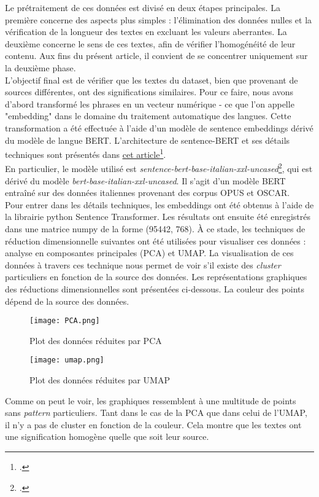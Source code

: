 Le prétraitement de ces données est divisé en deux étapes principales. La première concerne des aspects plus simples : l'élimination des données nulles et la vérification de la longueur des textes en excluant les valeurs aberrantes. La deuxième concerne le sens de ces textes, afin de vérifier l'homogénéité de leur contenu. Aux fins du présent article, il convient de se concentrer uniquement sur la deuxième phase.
\\

L'objectif final est de vérifier que les textes du dataset, bien que provenant de sources différentes, ont des significations similaires. Pour ce faire, nous avons d'abord transformé les phrases en un vecteur numérique - ce que l'on appelle "embedding" dans le domaine du traitement automatique des langues. Cette transformation a été effectuée à l'aide d'un modèle de sentence embeddings dérivé du modèle de langue BERT. L'architecture de sentence-BERT et ses détails techniques sont présentés dans \underline{\href{https://arxiv.org/abs/1908.10084}{cet article}}\footcite{reimers2019}.  \\
En particulier, le modèle utilisé est \emph{sentence-bert-base-italian-xxl-uncased}\footcite{sentenceBERT2024}, qui est dérivé du modèle \emph{bert-base-italian-xxl-uncased}. Il s'agit d'un modèle BERT entraîné sur des données italiennes provenant des corpus OPUS et OSCAR. \\

Pour entrer dans les détails techniques, les embeddings ont été obtenus à l'aide de la librairie python Sentence Transformer. Les résultats ont ensuite été enregistrés dans une matrice numpy de la forme (95442, 768). À ce stade, les techniques de réduction dimensionnelle suivantes ont été utilisées pour visualiser ces données : analyse en composantes principales (PCA) et UMAP. La visualisation de ces données à travers ces technique nous permet de voir s'il existe des \emph{cluster} particuliers en fonction de la source des données. Les représentations graphiques des réductions dimensionnelles sont présentées ci-dessous. La couleur des points dépend de la source des données.

\begin{figure}[h!]
	\texttt{[image: PCA.png]}
	\centering
	\caption{Plot des données réduites par PCA}
\end{figure}

\begin{figure}[h!]
	\texttt{[image: umap.png]}
	\centering
	\caption{Plot des données réduites par UMAP}
\end{figure}

\clearpage

Comme on peut le voir, les graphiques ressemblent à une multitude de points sans \emph{pattern} particuliers. Tant dans le cas de la PCA que dans celui de l'UMAP, il n'y a pas de cluster en fonction de la couleur. Cela montre que les textes ont une signification homogène quelle que soit leur source.